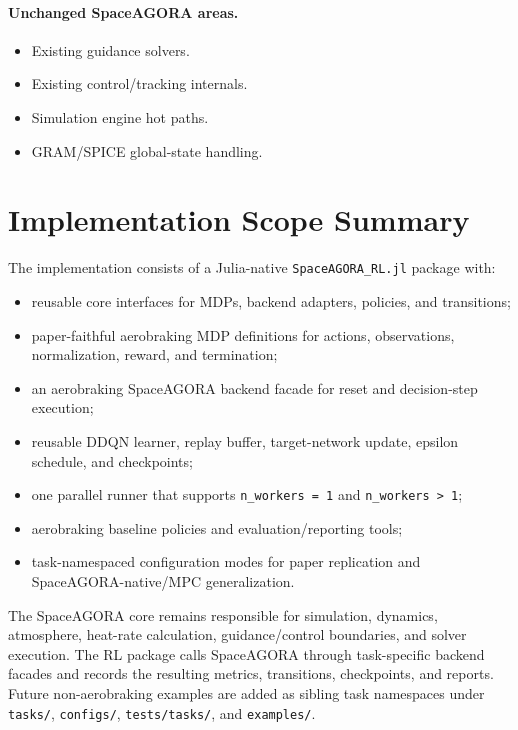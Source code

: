 \documentclass[11pt]{article}
\begin{document}
\paragraph{Unchanged SpaceAGORA areas.}

\begin{itemize}
\item Existing guidance solvers.
\item Existing control/tracking internals.
\item Simulation engine hot paths.
\item GRAM/SPICE global-state handling.
\end{itemize}



\section{Implementation Scope Summary}

The implementation consists of a Julia-native \texttt{SpaceAGORA\_RL.jl} package with:

\begin{itemize}
\item reusable core interfaces for MDPs, backend adapters, policies, and transitions;
\item paper-faithful aerobraking MDP definitions for actions, observations, normalization, reward, and termination;
\item an aerobraking SpaceAGORA backend facade for reset and decision-step execution;
\item reusable DDQN learner, replay buffer, target-network update, epsilon schedule, and checkpoints;
\item one parallel runner that supports \texttt{n\_workers = 1} and \texttt{n\_workers > 1};
\item aerobraking baseline policies and evaluation/reporting tools;
\item task-namespaced configuration modes for paper replication and SpaceAGORA-native/MPC generalization.
\end{itemize}

The SpaceAGORA core remains responsible for simulation, dynamics, atmosphere, heat-rate calculation, guidance/control boundaries, and solver execution. The RL package calls SpaceAGORA through task-specific backend facades and records the resulting metrics, transitions, checkpoints, and reports. Future non-aerobraking examples are added as sibling task namespaces under \texttt{tasks/}, \texttt{configs/}, \texttt{tests/tasks/}, and \texttt{examples/}.
\end{document}
